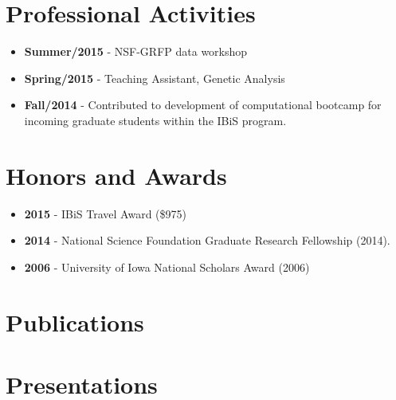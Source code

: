 \documentclass[11pt,a4paper,sans]{moderncv}
\begin{document}
\section{Professional Activities}
\begin{itemize}%
\item \textbf{Summer/2015} - NSF-GRFP data workshop
\item \textbf{Spring/2015} - Teaching Assistant, Genetic Analysis
\item \textbf{Fall/2014} - Contributed to development of computational bootcamp for incoming graduate students within the IBiS program.
\end{itemize}

\section{Honors and Awards}
\begin{itemize}%
\item \textbf{2015} - IBiS Travel Award (\$975)
\item \textbf{2014} - National Science Foundation Graduate Research Fellowship (2014). 
\item \textbf{2006} - University of Iowa National Scholars Award (2006)
\end{itemize}


\newpage
\section{Publications}

\nocite{thompson2015dyrk1a,Alul2013,cook2013ccmatch,cook2013generating,Ryckman2013b,Ryckman2012}


\printbibliography[heading=none]

\section{Presentations}
\begin{refsection}
\nocite{IWM15}
\printbibliography[heading=none,type=presentation,sorting=nyt]
\end{refsection}
\end{document}

